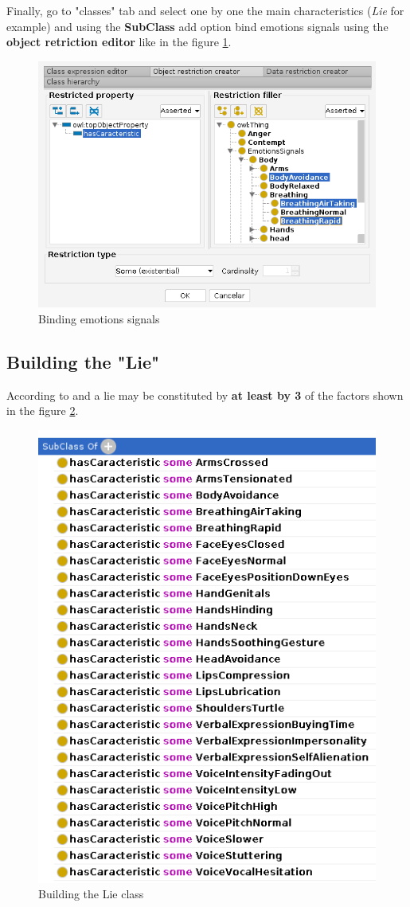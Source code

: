\documentclass[conference]{IEEEtran}
\begin{document}
Finally, go to "classes" tab and select one by one the main characteristics (\textit{Lie} for example) and using the \textbf{SubClass} add option bind emotions signals using the \textbf{object retriction editor} like in the figure \ref{fig:emotionscharacteristics}.
\begin{figure}[bpht]
	\centering
	\includegraphics[width=1\linewidth]{emotionsCharacteristics}
	\caption{Binding emotions signals}
	\label{fig:emotionscharacteristics}
\end{figure}

\subsection{Building the "Lie"}
According to \cite{ekman1974detecting} and \cite{ekman2001telling} a lie may be constituted by \textbf{at least by 3} of the factors shown in the figure \ref{fig:lie}.
\begin{figure}[bpht]
	\centering
	\includegraphics[width=0.7\linewidth]{lie}
	\caption{Building the Lie class}
	\label{fig:lie}
\end{figure}
\end{document}
